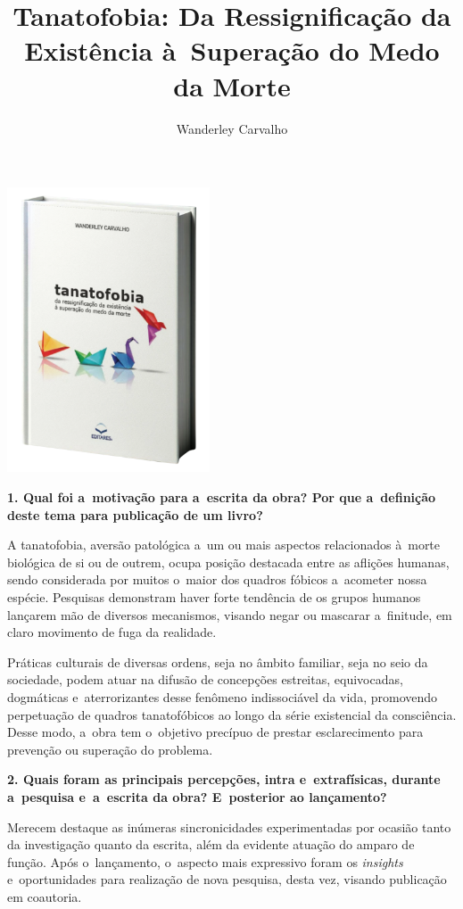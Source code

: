 \documentclass{gescons}
\author{Wanderley Carvalho}
\title{Tanatofobia: Da Ressignificação da Existência à~Superação do Medo da Morte}
\begin{document}
    \makeentrevistatitle

    \begin{multicols}{2}

\begin{center}
    \vspace{-0.5cm}
    \includegraphics[width=6cm]{articles/entrevista/mockups/Wanderley_Carvalho.png}
\end{center}


\textbf{1. Qual foi a~motivação para a~escrita da obra? Por que a~definição deste tema para publicação de um livro?}


A tanatofobia, aversão patológica a~um ou mais aspectos relacionados à~morte biológica de si ou de outrem, ocupa posição destacada entre as aflições humanas, sendo considerada por muitos o~maior dos quadros fóbicos a~acometer nossa espécie. Pesquisas demonstram haver forte tendência de os grupos humanos lançarem mão de diversos mecanismos, visando negar ou mascarar a~finitude, em claro movimento de fuga da realidade.

Práticas culturais de diversas ordens, seja no âmbito familiar, seja no seio da sociedade, podem atuar na difusão de concepções estreitas, equivocadas, dogmáticas e~aterrorizantes desse fenômeno indissociável da vida, promovendo perpetuação de quadros tanatofóbicos ao longo da série existencial da consciência. Desse modo, a~obra tem o~objetivo precípuo de prestar esclarecimento para prevenção ou superação do problema.

\textbf{2. Quais foram as principais percepções, intra e~extrafísicas, durante a~pesquisa e~a~escrita da obra? E~posterior ao lançamento?}

Merecem destaque as inúmeras sincronicidades experimentadas por ocasião tanto da investigação quanto da escrita, além da evidente atuação do amparo de função. Após o~lançamento, o~aspecto mais expressivo foram os \emph{insights} e~oportunidades para realização de nova pesquisa, desta vez, visando publicação em coautoria.


\end{multicols}
\end{document}
